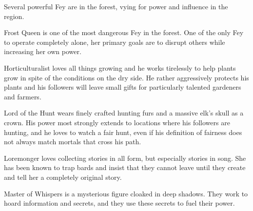 Several powerful Fey are in the forest, vying for power and influence in the region.

Frost Queen is one of the most dangerous Fey in the forest.
One of the only Fey to operate completely alone, her primary goals are to disrupt others while increasing her own power.

Horticulturalist loves all things growing and he works tirelessly to help plants grow in spite of the conditions on the dry side.
He rather aggressively protects his plants and his followers will leave small gifts for particularly talented gardeners and farmers.

Lord of the Hunt wears finely crafted hunting furs and a massive elk's skull as a crown.
His power most strongly extends to locations where his followers are hunting, and he loves to watch a fair hunt, even if his definition of fairness does not always match mortals that cross his path.

Loremonger loves collecting stories in all form, but especially stories in song.
She has been known to trap bards and insist that they cannot leave until they create and tell her a completely original story.

Master of Whispers is a mysterious figure cloaked in deep shadows.
They work to hoard information and secrets, and they use these secrets to fuel their power.
